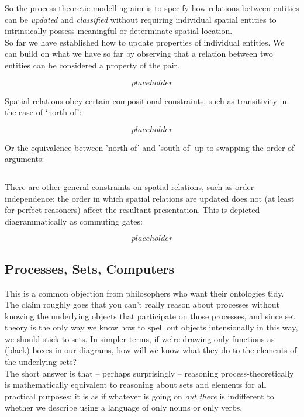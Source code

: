 So the process-theoretic modelling aim is to specify how relations between entities can be \emph{updated} and \emph{classified} without requiring individual spatial entities to intrinsically possess meaningful or determinate spatial location.\\

So far we have established how to update properties of individual entities. We can build on what we have so far by observing that a relation between two entities can be considered a property of the pair.

\[placeholder\]

Spatial relations obey certain compositional constraints, such as transitivity in the case of `north of':

\[placeholder\]

Or the equivalence between 'north of' and 'south of' up to swapping the order of arguments:

\[\]

There are other general constraints on spatial relations, such as order-independence: the order in which spatial relations are updated does not (at least for perfect reasoners) affect the resultant presentation. This is depicted diagrammatically as commuting gates:

\[placeholder\]

\subsection{Processes, Sets, Computers}


This is a common objection from philosophers who want their ontologies tidy. The claim roughly goes that you can't really reason about processes without knowing the underlying objects that participate on those processes, and since set theory is the only way we know how to spell out objects intensionally in this way, we should stick to sets. In simpler terms, if we're drawing only functions as (black)-boxes in our diagrams, how will we know what they do to the elements of the underlying sets?\\

The short answer is that -- perhaps surprisingly -- reasoning process-theoretically is mathematically equivalent to reasoning about sets and elements for all practical purposes; it is as if whatever is going on \emph{out there} is indifferent to whether we describe using a language of only nouns or only verbs.\\

